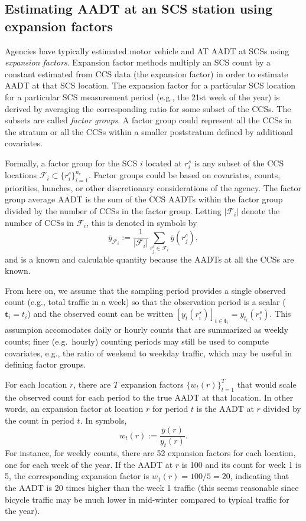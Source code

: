 \documentclass[11pt]{article}
\begin{document}


    \subsection{Estimating AADT at an SCS station using expansion
factors}\label{estimating-aadt-at-an-scs-station-using-expansion-factors}

Agencies have typically estimated motor vehicle and AT AADT at SCSs
using \emph{expansion factors}. Expansion factor methods multiply an SCS
count by a constant estimated from CCS data (the expansion factor) in
order to estimate AADT at that SCS location. The expansion factor for a
particular SCS location for a particular SCS measurement period (e.g.,
the 21st week of the year) is derived by averaging the corresponding
ratio for some subset of the CCSs. The subsets are called \emph{factor
groups}. A factor group could represent all the CCSs in the stratum or
all the CCSs within a smaller poststratum defined by additional
covariates.

Formally, a factor group for the SCS \(i\) located at \(r_i^s\) is any
subset of the CCS locations
\(\mathcal{F}_i \subset \{r^c_i\}_{i=1}^{n_c}\). Factor groups could be
based on covariates, counts, priorities, hunches, or other discretionary
considerations of the agency. The factor group average AADT is the sum
of the CCS AADTs within the factor group divided by the number of CCSs
in the factor group. Letting \(|\mathcal{F}_i|\) denote the number of
CCSs in \(\mathcal{F}_i\), this is denoted in symbols by
\[\bar{y}_{\mathcal{F}_i} := \frac{1}{|\mathcal{F}_i|} \sum_{r_j^c \in \mathcal{F}_i} \bar{y}(r_j^c),\]
and is a known and calculable quantity because the AADTs at all the CCSs
are known.

From here on, we assume that the sampling period provides a single
observed count (e.g., total traffic in a week) so that the observation
period is a scalar (\(\mathbf{t}_i = t_i\)) and the observed count can
be written \([y_t(r_i^s)]_{t \in \mathbf{t}_i} = y_{t_i}(r_i^s)\). This
assumpion accomodates daily or hourly counts that are summarized as
weekly counts; finer (e.g.~hourly) counting periods may still be used to
compute covariates, e.g., the ratio of weekend to weekday traffic, which
may be useful in defining factor groups.

For each location \(r\), there are \(T\) expansion factors
\(\{w_t(r)\}_{t=1}^T\) that would scale the observed count for each
period to the true AADT at that location. In other words, an expansion
factor at location \(r\) for period \(t\) is the AADT at \(r\) divided
by the count in period \(t\). In symbols,
\[w_t(r) := \frac{\bar{y}(r)}{y_t(r)}.\] For instance, for weekly
counts, there are 52 expansion factors for each location, one for each
week of the year. If the AADT at \(r\) is 100 and its count for week 1
is 5, the corresponding expansion factor is \(w_1(r) = 100/5 = 20\),
indicating that the AADT is 20 times higher than the week 1 traffic
(this seems reasonable since bicycle traffic may be much lower in
mid-winter compared to typical traffic for the year).
\end{document}
